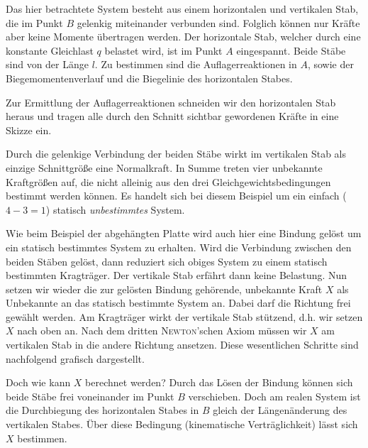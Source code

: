 \FloatBarrier
%
\begin{example}
	Das hier betrachtete System besteht aus einem horizontalen und vertikalen Stab, die im Punkt $B$ gelenkig miteinander verbunden sind.
	Folglich können nur Kräfte aber keine Momente übertragen werden\footnotemark{}.
	Der horizontale Stab, welcher durch eine konstante Gleichlast $q$ belastet wird, ist im Punkt $A$ eingespannt.
	Beide Stäbe sind von der Länge $l$.
	Zu bestimmen sind die Auflagerreaktionen in $A$, sowie der Biegemomentenverlauf und die Biegelinie des horizontalen Stabes.
	\begin{center}
		
	\end{center}
	
	Zur Ermittlung der Auflagerreaktionen schneiden wir den horizontalen Stab heraus und tragen alle durch den Schnitt sichtbar gewordenen Kräfte in eine Skizze ein.
	\begin{center}
		
	\end{center}
	Durch die gelenkige Verbindung der beiden Stäbe wirkt im vertikalen Stab als einzige Schnittgröße eine Normalkraft.
	In Summe treten vier unbekannte Kraftgrößen auf, die nicht alleinig aus den drei Gleichgewichtsbedingungen bestimmt werden können.
	Es handelt sich bei diesem Beispiel um ein einfach ($4-3=1$) statisch \emph{unbestimmtes} System.
	
	Wie beim Beispiel der abgehängten Platte wird auch hier eine Bindung gelöst um ein statisch bestimmtes System zu erhalten.
	Wird die Verbindung zwischen den beiden Stäben gelöst, dann reduziert sich obiges System zu einem statisch bestimmten Kragträger.
	Der vertikale Stab erfährt dann keine Belastung.
	Nun setzen wir wieder die zur gelösten Bindung gehörende, unbekannte Kraft $X$ als Unbekannte an das statisch bestimmte System an.
	Dabei darf die Richtung frei gewählt werden. Am Kragträger wirkt der vertikale Stab stützend, d.h. wir setzen $X$ nach oben an.
	Nach dem dritten \textsc{Newton}'schen Axiom müssen wir $X$ am vertikalen Stab in die andere Richtung ansetzen.
	Diese wesentlichen Schritte sind nachfolgend grafisch dargestellt.
	\begin{center}
		
	\end{center}
	Doch wie kann $X$ berechnet werden? Durch das Lösen der Bindung können sich beide Stäbe frei voneinander im Punkt $B$ verschieben. 
	Doch am realen System ist die Durchbiegung des horizontalen Stabes in $B$ gleich der Längenänderung des vertikalen Stabes.
	Über diese Bedingung (kinematische Verträglichkeit) lässt sich $X$ bestimmen. 
	

\end{example}
